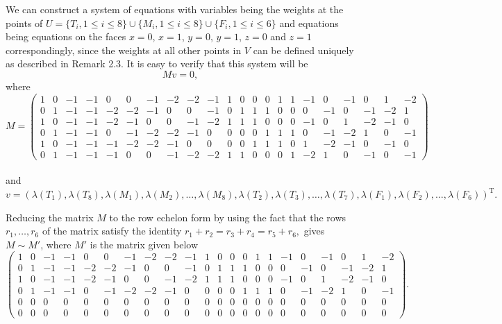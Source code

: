 \documentclass[12p]{article}
\numberwithin{equation}{section}
\begin{document}
We can construct a system of equations with variables being the weights at the points of \(U=\{T_i, 1 \le i \le 8\} \cup\{M_i, 1 \le i \le 8\} \cup \{F_i, 1 \le i \le 6\}\) and equations being equations on the faces $x=0$, $x=1$, $y=0$, $y=1$, $z=0$ and $z=1$ correspondingly, since the weights at all other points in \(V\) can be defined uniquely as described in Remark 2.3. It is easy to verify that this system will be 
\[
Mv=0,
\]
where
\[
M=
\begin{pmatrix}
    1 & 0 & -1 & -1 & 0 & 0 & -1 & -2 & -2 & -1 & 1 & 0 & 0 & 0 & 1 & 1 & -1 & 0 & -1 & 0 & 1 & -2 \\
    0 & 1 & -1 & -1 & -2 & -2 & -1 & 0 & 0 & -1 & 0 & 1 & 1 & 1 & 0 & 0 & 0 & -1 & 0 & -1 & -2 & 1 \\
    1 & 0 & -1 & -1 & -2 & -1 & 0 & 0 & -1 & -2 & 1 & 1 & 1 & 0 & 0 & 0 & -1 & 0 & 1 & -2 & -1 & 0 \\
    0 & 1 & -1 & -1 & 0 & -1 & -2 & -2 & -1 & 0 & 0 & 0 & 0 & 1 & 1 & 1 & 0 & -1 & -2 & 1 & 0 & -1 \\
    1 & 0 & -1 & -1 & -1 & -2 & -2 & -1 & 0 & 0 & 0 & 0 & 1 & 1 & 1 & 0 & 1 & -2 & -1 & 0 & -1 & 0 \\
    0 & 1 & -1 & -1 & -1 & 0 & 0 & -1 & -2 & -2 & 1 & 1 & 0 & 0 & 0 & 1 & -2 & 1 & 0 & -1 & 0 & -1
\end{pmatrix}
\]
\\
and
\(
v=(\lambda(T_1),\lambda(T_8),\lambda(M_1),\lambda(M_2),
\dots,\lambda(M_8),\lambda(T_2),\lambda(T_3),
\dots,\lambda(T_7),\lambda(F_1),\lambda(F_2),
\dots,\lambda(F_6))^\mathrm{T}.
\)

Reducing the matrix \(M\) to the row echelon form by using the fact that the rows \(r_1,\dots,r_6\) of the matrix satisfy the identity
\(
r_1+r_2=r_3+r_4=r_5+r_6,
\)
gives \(M \sim M'\), where \( M'\) is the matrix given below
\\
\[
\begin{pmatrix}
    1 & 0 & -1 & -1 & 0 & 0 & -1 & -2 & -2 & -1 & 1 & 0 & 0 & 0 & 1 & 1 & -1 & 0 & -1 & 0 & 1 & -2 \\
    0 & 1 & -1 & -1 & -2 & -2 & -1 & 0 & 0 & -1 & 0 & 1 & 1 & 1 & 0 & 0 & 0 & -1 & 0 & -1 & -2 & 1 \\
    1 & 0 & -1 & -1 & -2 & -1 & 0 & 0 & -1 & -2 & 1 & 1 & 1 & 0 & 0 & 0 & -1 & 0 & 1 & -2 & -1 & 0 \\
    0 & 1 & -1 & -1 & 0 & -1 & -2 & -2 & -1 & 0 & 0 & 0 & 0 & 1 & 1 & 1 & 0 & -1 & -2 & 1 & 0 & -1 \\
    0 & 0 & 0 &0 &0 & 0 & 0 &0 &0 & 0 & 0 &0 &0 & 0 & 0 &0 &0 & 0 & 0 &0 &0 & 0\\
    0 & 0 & 0 &0 &0 & 0 & 0 &0 &0 & 0 & 0 &0 &0 & 0 & 0 &0 &0 & 0 & 0 &0 &0 & 0 
\end{pmatrix}.\]
\bigskip
\end{document}
